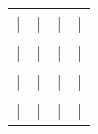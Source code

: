 \begin{spacing}{1.5}
\begin{center}
\begin{table}[H]
\begin{tabular}{@{}|c|c|c|c|@{}}
|                                                                                                          & |                                                                                     & |                                                                                          & |                                                                                                                              \\
|                                                                                                          & |                                                                                     & |                                                                                          & |                                                                                                                              \\
|                                                                                                          & |                                                                                     & |                                                                                          & |                                                                                                                              \\
|                                                                                                          & |                                                                                     & |                                                                                          & |                                                                                                                              \\


\end{tabular}
\end{table}
\end{center}
\end{spacing}
